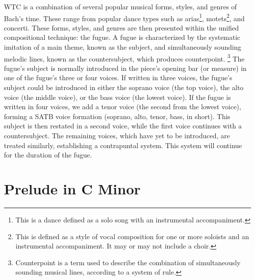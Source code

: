 WTC is a combination of several popular musical forms, styles, and genres of Bach's time. These range from popular dance types such as arias\footnote{This is a dance defined as a solo song with an instrumental accompaniment.}\autocite{Marshall_Emery_2019}, motets\footnote{This is defined as a style of vocal composition for one or more soloists and an instrumental accompaniment. It may or may not include a choir.}\autocite{Marshall_Emery_2019}, and concerti. These forms, styles, and genres are then presented within the unified compositional technique: the fugue. A fugue is characterized by the systematic imitation of a main theme, known as the subject, and simultaneously sounding melodic lines, known as the countersubject, which produces counterpoint. \autocite{Marshall_Emery_2019}\footnote{Counterpoint is a term used to describe the combination of simultaneously sounding musical lines, according to a system of rule.}\autocite{Sachs_Dahlhaus_2001} The fugue's subject is normally introduced in the piece's opening bar (or measure) in one of the fugue's three or four voices. If written in three voices, the fugue's subject could be introduced in either the soprano voice (the top voice), the alto voice (the middle voice), or the bass voice (the lowest voice). If the fugue is written in four voices, we add a tenor voice (the second from the lowest voice), forming a SATB voice formation (soprano, alto, tenor, bass, in short). This subject is then restated in a second voice, while the first voice continues with a countersubject. The remaining voices, which have yet to be introduced, are treated similarly, establishing a contrapuntal system. This system will continue for the duration of the fugue.

\section{Prelude in C Minor}

